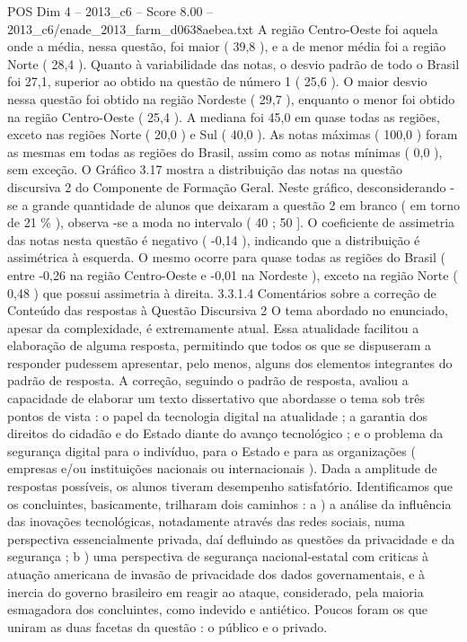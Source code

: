 \begin{textsample}{POS Dim 4 – 2013\_c6 – Score 8.00 – 2013\_c6/enade\_2013\_farm\_d0638aebea.txt}
A região Centro-Oeste foi aquela onde a média, nessa questão, foi maior ( 39,8 ), e a de menor média foi a região Norte ( 28,4 ).
Quanto à variabilidade das notas, o desvio padrão de todo o Brasil foi 27,1, superior ao obtido na questão de número 1 ( 25,6 ).
O maior desvio nessa questão foi obtido na região Nordeste ( 29,7 ), enquanto o menor foi obtido na região Centro-Oeste ( 25,4 ).
A mediana foi 45,0 em quase todas as regiões, exceto nas regiões Norte ( 20,0 ) e Sul ( 40,0 ).
As notas máximas ( 100,0 ) foram as mesmas em todas as regiões do Brasil, assim como as notas mínimas ( 0,0 ), sem exceção.
O Gráfico 3.17 mostra a distribuição das notas na questão discursiva 2 do Componente de Formação Geral.
Neste gráfico, desconsiderando -se a grande quantidade de alunos que deixaram a questão 2 em branco ( em torno de 21 \% ), observa -se a moda no intervalo ( 40 ; 50 ].
O coeficiente de assimetria das notas nesta questão é negativo ( -0,14 ), indicando que a distribuição é assimétrica à esquerda.
O mesmo ocorre para quase todas as regiões do Brasil ( entre -0,26 na região Centro-Oeste e -0,01 na Nordeste ), exceto na região Norte ( 0,48 ) que possui assimetria à direita. 3.3.1.4 Comentários sobre a correção de Conteúdo das respostas à Questão Discursiva 2 O tema abordado no enunciado, apesar da complexidade, é extremamente atual.
Essa atualidade facilitou a elaboração de alguma resposta, permitindo que todos os que se dispuseram a responder pudessem apresentar, pelo menos, alguns dos elementos integrantes do padrão de resposta.
A correção, seguindo o padrão de resposta, avaliou a capacidade de elaborar um texto dissertativo que abordasse o tema sob três pontos de vista : o papel da tecnologia digital na atualidade ; a garantia dos direitos do cidadão e do Estado diante do avanço tecnológico ; e o problema da segurança digital para o indivíduo, para o Estado e para as organizações ( empresas e/ou instituições nacionais ou internacionais ).
Dada a amplitude de respostas possíveis, os alunos tiveram desempenho satisfatório.
Identificamos que os concluintes, basicamente, trilharam dois caminhos : a ) a análise da influência das inovações tecnológicas, notadamente através das redes sociais, numa perspectiva essencialmente privada, daí defluindo as questões da privacidade e da segurança ; b ) uma perspectiva de segurança nacional-estatal com criticas à atuação americana de invasão de privacidade dos dados governamentais, e à inercia do governo brasileiro em reagir ao ataque, considerado, pela maioria esmagadora dos concluintes, como indevido e antiético.
Poucos foram os que uniram as duas facetas da questão : o público e o privado.

\end{textsample}
